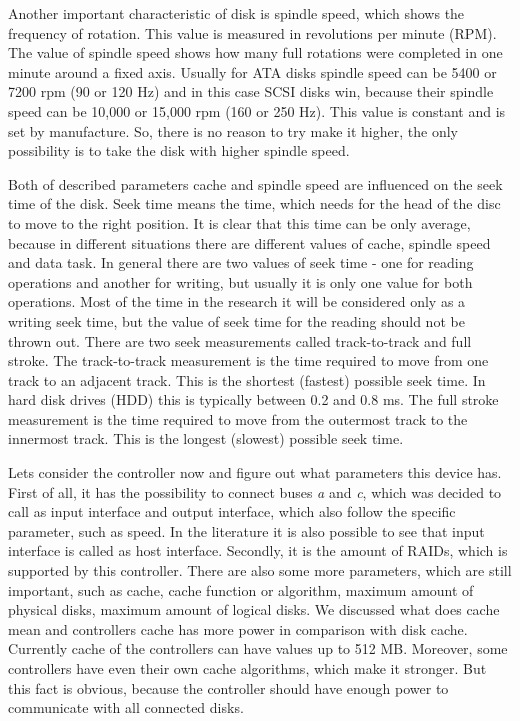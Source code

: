 Another important characteristic of disk is spindle speed, which shows the frequency of rotation. This value is measured in revolutions per minute (RPM). The value of spindle speed shows how many full rotations were completed in one minute around a fixed axis. Usually for ATA disks spindle speed can be 5400 or 7200 rpm (90 or 120 Hz) and in this case SCSI disks win, because their spindle speed can be 10,000 or 15,000 rpm (160 or 250 Hz). This value is constant and is set by manufacture. So, there is no reason to try make it higher, the only possibility is to take the disk with higher spindle speed.

Both of described parameters cache and spindle speed are influenced on the seek time of the disk. Seek time means the time, which needs for the head of the disc to move to the right position. It is clear that this time can be only average, because in different situations there are different values of cache, spindle speed and data task. In general there are two values of seek time - one for reading operations and another for writing, but usually it is only one value for both operations. Most of the time in the research it will be considered only as a writing seek time, but the value of seek time for the reading should not be thrown out. There are two seek measurements called track-to-track and full stroke. The track-to-track measurement is the time required to move from one track to an adjacent track. This is the shortest (fastest) possible seek time. In hard disk drives (HDD) this is typically between 0.2 and 0.8 ms. The full stroke measurement is the time required to move from the outermost track to the innermost track. This is the longest (slowest) possible seek time.

Lets consider the controller now and figure out what parameters this device has. First of all, it has the possibility to connect buses \emph{a} and \emph{c}, which was decided to call as input interface and output interface, which also follow the specific parameter, such as speed. In the literature it is also possible to see that input interface is called as host interface. Secondly, it is the amount of RAIDs, which is supported by this controller. There are also some more parameters, which are still important, such as cache, cache function or algorithm, maximum amount of physical disks, maximum amount of logical disks. We discussed what does cache mean and controllers cache has more power in comparison with disk cache. Currently cache of the controllers can have values up to 512 MB. Moreover, some controllers have even their own cache algorithms, which make it stronger. But this fact is obvious, because the controller should have enough power to communicate with all connected disks.

